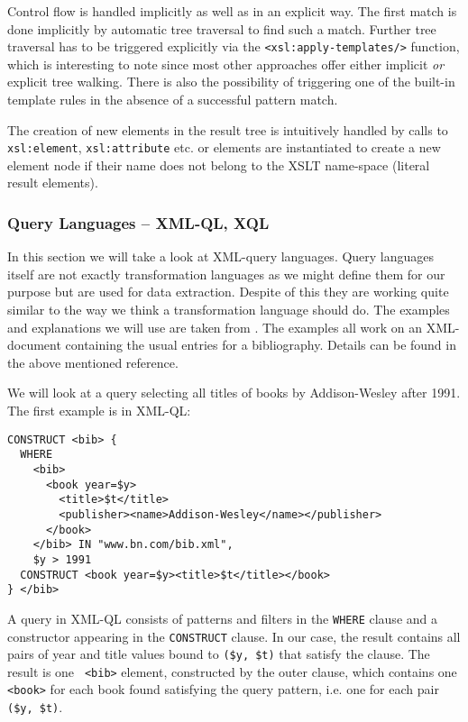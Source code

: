 \documentclass[a4paper,11pt]{scrartcl}
\begin{document}
Control flow is handled implicitly as well as in an explicit way. The
first match is done implicitly by automatic tree traversal to find
such a match. Further tree traversal has to be triggered explicitly via
the {\tt <xsl:apply-templates/>} function, which is interesting to
note since most other approaches offer either implicit {\it or}
explicit tree walking. There is also the possibility of triggering one
of the built-in template rules in the absence of a successful pattern
match. 

The creation of new elements in the result tree is intuitively handled
by calls to {\tt xsl:element}, {\tt xsl:attribute} etc. or elements
are instantiated to create a new element node if their name does not
belong to the XSLT name-space (literal result elements).

\subsubsection{Query Languages -- XML-QL, XQL}
In this section we will take a look at XML-query languages. Query
languages itself are not exactly transformation languages as we might
define them for our purpose but are used for data extraction. Despite
of this they are working quite similar to the way we think a
transformation language should do. The examples and explanations we
will use are taken from \cite{FSW}. The examples all work on an
XML-document containing the usual entries for a bibliography. Details
can be found in the above mentioned reference.

We will look at a query selecting all titles of books by Addison-Wesley
after 1991. The first example is in XML-QL:

\begin{verbatim}
CONSTRUCT <bib> {
  WHERE 
    <bib>
      <book year=$y>
        <title>$t</title>
        <publisher><name>Addison-Wesley</name></publisher>
      </book> 
    </bib> IN "www.bn.com/bib.xml", 
    $y > 1991
  CONSTRUCT <book year=$y><title>$t</title></book>
} </bib>
\end{verbatim}

A query in XML-QL consists of patterns and filters in the {\tt WHERE}
clause and a constructor appearing in the {\tt CONSTRUCT} clause. In
our case, the result contains all pairs of year and title values bound 
to {\tt (\$y, \$t)} that satisfy the clause. The result is one {\tt
  <bib>} element, constructed by the outer clause, which contains one
{\tt <book>} for each book found satisfying the query pattern,
i.e. one for each pair {\tt (\$y, \$t)}.
\end{document}
